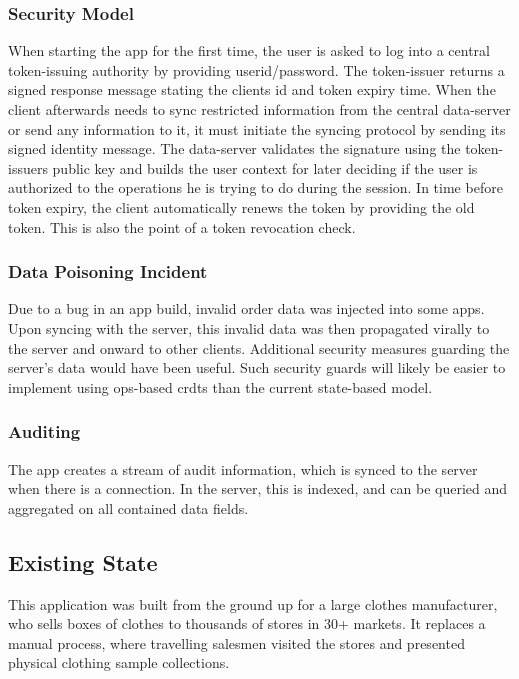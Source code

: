\documentclass[11pt,a4paper]{report}
\begin{document}
\subsubsection{Security Model}
When starting the app for the first time, the user is asked to log into a central token-issuing authority by providing userid/password. The token-issuer returns a signed response message stating the clients id and token expiry time.
When the client afterwards needs to sync restricted information from the central data-server or send any information to it, it must initiate the syncing protocol by sending its signed identity message. The data-server validates the signature using the token-issuers public key and builds the user context for later deciding if the user is authorized to the operations he is trying to do during the session.
In time before token expiry, the client automatically renews the token by providing the old token. This is also the point of a token revocation check.

\subsubsection{Data Poisoning Incident}
Due to a bug in an app build, invalid order data was injected into some apps. Upon syncing with the server, this invalid data was then propagated virally to the server and onward to other clients.
Additional security measures guarding the server's data would have been useful. Such security guards will likely be easier to implement using ops-based \glspl{crdt} than the current state-based model.
\subsubsection{Auditing}

The app creates a stream of audit information, which is synced to the server when there is a connection. In the server, this is indexed, and can be queried and aggregated on all contained data fields.

\subsection{Existing State}
This application was built from the ground up for a large clothes manufacturer, who sells boxes of clothes to thousands of stores in 30+ markets.
It replaces a manual process, where travelling salesmen visited the stores and presented physical clothing sample collections.
\end{document}
